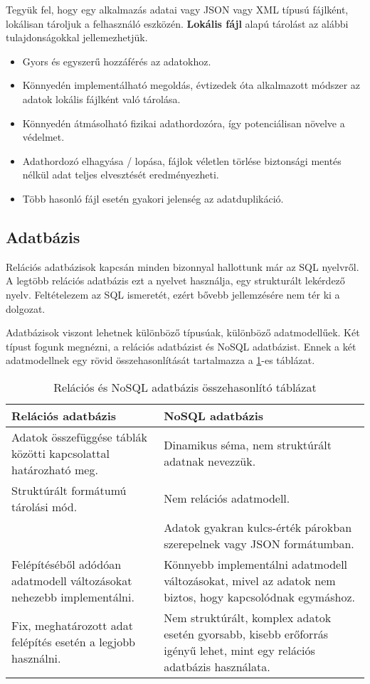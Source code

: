 \vspace{6pt}
\noindent Tegyük fel, hogy egy alkalmazás adatai vagy JSON vagy XML típusú fájlként, lokálisan tároljuk a felhasználó eszközén. \textbf{Lokális fájl} alapú tárolást az alábbi tulajdonságokkal jellemezhetjük.
\begin{itemize}
	\item Gyors és egyszerű hozzáférés az adatokhoz.
	\item Könnyedén implementálható megoldás, évtizedek óta alkalmazott módszer az adatok lokális fájlként való tárolása.
	\item Könnyedén átmásolható fizikai adathordozóra, így potenciálisan növelve a védelmet.
	\item Adathordozó elhagyása / lopása, fájlok véletlen törlése biztonsági mentés nélkül adat teljes elvesztését eredményezheti.
	\item Több hasonló fájl esetén gyakori jelenség az adatduplikáció. 
\end{itemize}


\newpage
\subsection{Adatbázis}

Relációs adatbázisok kapcsán minden bizonnyal hallottunk már az SQL nyelvről. A legtöbb relációs adatbázis ezt a nyelvet használja, egy strukturált lekérdező nyelv. Feltételezem az SQL ismeretét, ezért bővebb jellemzésére nem tér ki a dolgozat.


Adatbázisok viszont lehetnek különböző típusúak, különböző adatmodellűek. Két típust fogunk megnézni, a relációs adatbázist és NoSQL adatbázist. Ennek a két adatmodellnek egy rövid összehasonlítását tartalmazza a \ref{tab:rdbmsandnosql}-es táblázat.

\begin{table}[H]
	\centering
	\caption{Relációs és NoSQL adatbázis összehasonlító táblázat}
	\label{tab:rdbmsandnosql}
	\medskip	
	\begin{tabular}{|p{7.2cm}|p{7.2cm}|}
		\hline
		\textbf{Relációs adatbázis} & \textbf{NoSQL adatbázis} \\
		\hline
		Adatok összefüggése táblák közötti kapcsolattal határozható meg. &  Dinamikus séma, nem struktúrált adatnak nevezzük.\\
		Struktúrált formátumú tárolási mód. & Nem relációs adatmodell.\\
		& Adatok gyakran kulcs-érték párokban szerepelnek vagy JSON formátumban.\\
		\hline
		Felépítéséből adódóan adatmodell változásokat nehezebb implementálni. & Könnyebb implementálni adatmodell változásokat, mivel az adatok nem biztos, hogy kapcsolódnak egymáshoz. \\
		\hline
		Fix, meghatározott adat felépítés esetén a legjobb használni. & Nem struktúrált, komplex adatok esetén gyorsabb, kisebb erőforrás igényű lehet, mint egy relációs adatbázis használata.\\
		\hline
	\end{tabular}
\end{table}

